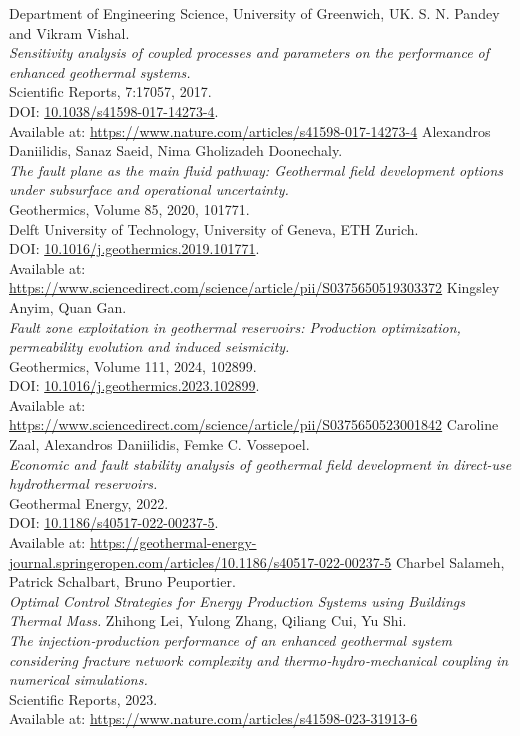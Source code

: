 \documentclass[a4paper,12pt]{report}
\begin{document}
\begin{thebibliography}{10}
  Department of Engineering Science, University of Greenwich, UK.
  S. N. Pandey and Vikram Vishal.\\
  \textit{Sensitivity analysis of coupled processes and parameters on the performance of enhanced geothermal systems.}\\
  Scientific Reports, 7:17057, 2017.\\
  DOI: \href{https://doi.org/10.1038/s41598-017-14273-4}{10.1038/s41598-017-14273-4}.\\
  Available at: \url{https://www.nature.com/articles/s41598-017-14273-4}
    Alexandros Daniilidis, Sanaz Saeid, Nima Gholizadeh Doonechaly.\\
    \textit{The fault plane as the main fluid pathway: Geothermal field development options under subsurface and operational uncertainty.}\\
    Geothermics, Volume 85, 2020, 101771.\\
    Delft University of Technology, University of Geneva, ETH Zurich.\\
    DOI: \href{https://doi.org/10.1016/j.geothermics.2019.101771}{10.1016/j.geothermics.2019.101771}.\\
    Available at: \url{https://www.sciencedirect.com/science/article/pii/S0375650519303372}
  Kingsley Anyim, Quan Gan.\\
  \textit{Fault zone exploitation in geothermal reservoirs: Production optimization, permeability evolution and induced seismicity.}\\
  Geothermics, Volume 111, 2024, 102899.\\
  DOI: \href{https://doi.org/10.1016/j.geothermics.2023.102899}{10.1016/j.geothermics.2023.102899}.\\
  Available at: \url{https://www.sciencedirect.com/science/article/pii/S0375650523001842}
  Caroline Zaal, Alexandros Daniilidis, Femke C. Vossepoel.\\
  \textit{Economic and fault stability analysis of geothermal field development in direct-use hydrothermal reservoirs.}\\
  Geothermal Energy, 2022.\\
  DOI: \href{https://doi.org/10.1186/s40517-022-00237-5}{10.1186/s40517-022-00237-5}.\\
  Available at: \url{https://geothermal-energy-journal.springeropen.com/articles/10.1186/s40517-022-00237-5}
  Charbel Salameh, Patrick Schalbart, Bruno Peuportier.\\
  \textit{Optimal Control Strategies for Energy Production Systems using Buildings Thermal Mass.}
  Zhihong Lei, Yulong Zhang, Qiliang Cui, Yu Shi.\\
  \textit{The injection‑production performance of an enhanced geothermal system considering fracture network complexity and thermo‑hydro‑mechanical coupling in numerical simulations.}\\
  Scientific Reports, 2023.\\
  Available at: \url{https://www.nature.com/articles/s41598-023-31913-6}
  
\end{thebibliography}
\end{document}
